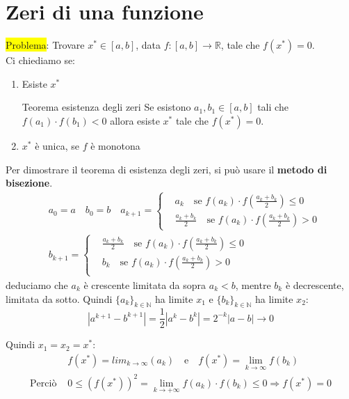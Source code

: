 \documentclass{article}
\begin{document}
\section{Zeri di una funzione}

\colorbox{yellow}{Problema}: Trovare $x^\ast\in[a,b]$, data $f:[a,b]\to\mathbb R$, tale che $f(x^*)=0$.\\
Ci chiediamo se:
\begin{enumerate}
    \item Esiste $x^*$
          \begin{theo}{Teorema esistenza degli zeri}{}
              Se esistono $a_1,b_1\in[a,b]$ tali che $f(a_1)\cdot f(b_1)<0$ allora esiste $x^*$ tale che $f(x^*)=0$.
          \end{theo}
    \item $x^*$ è unica, se $f$ è monotona
\end{enumerate}

Per dimostrare il teorema di esistenza degli zeri, si può usare il \textbf{metodo di bisezione}.
\begin{align*}
     & a_0=a\quad b_0=b\quad a_{k+1}=\begin{cases}
                                          & a_k\quad \text{se }f(a_k)\cdot f\left(\frac{a_k+b_k}{2}\right)\le0            \\
                                          & \frac{a_k+b_k}{2}\quad\text{se }f(a_k)\cdot f\left(\frac{a_k+b_k}{2}\right)>0
                                     \end{cases} \\
     & b_{k+1}=\begin{cases}
                    & \frac{a_k+b_k}{2}\quad \text{se }f(a_k)\cdot f\left(\frac{a_k+b_k}{2}\right)\le0 \\
                    & b_k\quad \text{se }f(a_k)\cdot f\left(\frac{a_k+b_k}{2}\right)>0                 \\
               \end{cases}
\end{align*}
deduciamo che $a_k$ è crescente limitata da sopra $a_k<b$, mentre $b_k$ è decrescente, limitata da sotto.
Quindi $\{a_k\}_{k\in\mathbb N}$ ha limite $x_1$ e $\{b_k\}_{k\in\mathbb N}$ ha limite $x_2$:
\[\left|a^{k+1}-b^{k+1}\right|=\frac{1}{2}\left|a^k-b^k\right|=2^{-k}\left|a-b\right|\to 0\]

Quindi $x_1=x_2=x^*$:
\begin{align*}
                   & f(x^*)=lim_{k\to\infty}(a_k)\quad\text{e}\quad f(x^*)=\lim_{k\to\infty}f(b_k)            \\
    \text{Perciò } & 0\le\left(f(x^*)\right)^2=\lim_{k\to+\infty} f(a_k)\cdot f(b_k)\le 0\Rightarrow f(x^*)=0
\end{align*}
\end{document}
